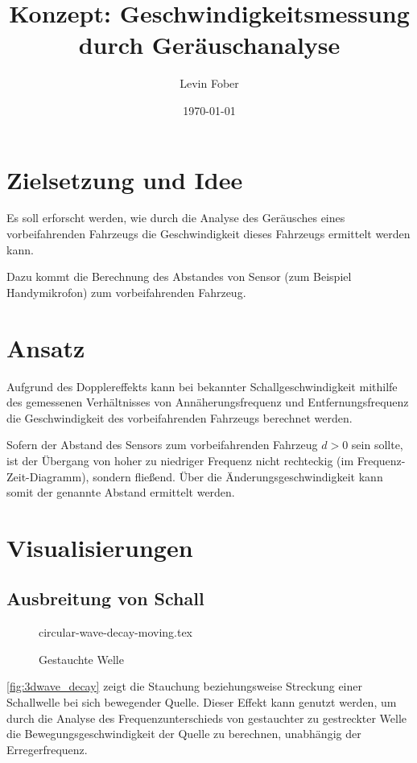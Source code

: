 \documentclass[12pt, a4paper]{article}
\title{Konzept: Ge\-schwin\-dig\-keits\-mes\-sung durch Ge\-räusch\-ana\-ly\-se}
\author{Levin Fober}
\date{\today}
\begin{document}
\maketitle

\newpage

\thispagestyle{plain}

\tableofcontents

\newpage

\thispagestyle{plain}

\section{Zielsetzung und Idee}
Es soll erforscht werden, wie durch die Analyse des Geräusches eines
vorbeifahrenden Fahrzeugs die Geschwindigkeit dieses Fahrzeugs ermittelt werden
kann.

Dazu kommt die Berechnung des Abstandes von Sensor (zum Beispiel Handymikrofon)
zum vorbeifahrenden Fahrzeug.

\section{Ansatz}
Aufgrund des Dopplereffekts kann bei bekannter Schallgeschwindigkeit mithilfe
des gemessenen Verhältnisses von Annäherungsfrequenz und Entfernungsfrequenz die
Geschwindigkeit des vorbeifahrenden Fahrzeugs berechnet werden.

Sofern der Abstand des Sensors zum vorbeifahrenden Fahrzeug \(d > 0\) sein
sollte, ist der Übergang von hoher zu niedriger Frequenz nicht rechteckig (im
Frequenz-Zeit-Diagramm), sondern fließend. Über die Änderungsgeschwindigkeit
kann somit der genannte Abstand ermittelt werden.

\section{Visualisierungen}

\subsection{Ausbreitung von Schall}

\begin{figure}[htbp]
    \centering
    {circular-wave-decay-moving.tex}
    \caption{Gestauchte Welle}
    \label{fig:3dwave_decay}
\end{figure}

\autoref{fig:3dwave_decay} zeigt die Stauchung beziehungsweise Streckung einer
Schallwelle bei sich bewegender Quelle. Dieser Effekt kann genutzt werden, um
durch die Analyse des Frequenzunterschieds von gestauchter zu gestreckter Welle
die Bewegungsgeschwindigkeit der Quelle zu berechnen, unabhängig der
Erregerfrequenz.
\end{document}
